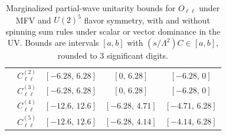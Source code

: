 \begin{table}[tbp]
{\begin{tabular}{ccccc}
        & $C_{\ell\ell}^{(2)}$ & $[-6.28,\, 6.28]$ & $[0,\, 6.28]$     & $[-6.28,\, 0]$    \\
        & $C_{\ell\ell}^{(3)}$ & $[-6.28,\, 6.28]$ & $[0,\, 6.28]$     & $[-6.28,\, 0]$    \\
        & $C_{\ell\ell}^{(4)}$ & $[-12.6,\, 12.6]$ & $[-6.28,\, 4.71]$ & $[-4.71,\, 6.28]$ \\
        & $C_{\ell\ell}^{(5)}$ & $[-12.6,\, 12.6]$ & $[-6.28,\, 4.14]$ & $[-4.14,\, 6.28]$ \\
    \bottomrule
\end{tabular}}
\caption{Marginalized partial-wave unitarity bounds for $O_{\ell\ell}$ under MFV and $U(2)^5$
flavor symmetry, with and without spinning sum rules under scalar or vector dominance in the UV.
Bounds are intervals $[a,b]$ with $(s/\Lambda^2)C \in [a,b]$, rounded to 3 significant digits.}
\label{tab:Oll_UB}
\end{table}
